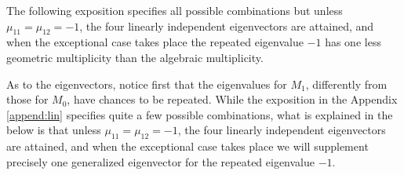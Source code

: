 \documentclass[a4paper,11pt]{article}
\theoremstyle{remark}
\begin{document}

The following exposition specifies all possible combinations but unless $\mu_{11}=\mu_{12}=-1$, the four linearly independent eigenvectors are attained, and when the exceptional case takes place the repeated eigenvalue $-1$ has one less geometric multiplicity than the algebraic multiplicity.%

As to the eigenvectors, notice first that the eigenvalues for $M_1$, differently from those for $M_0$, have chances to be repeated. While the exposition in the Appendix \ref{append:lin} specifies quite a few possible combinations, what is explained in the below is that unless $\mu_{11}=\mu_{12}=-1$, the four linearly independent eigenvectors are attained, and when the exceptional case takes place we will supplement precisely one generalized eigenvector for the repeated eigenvalue $-1$.
\end{document}
